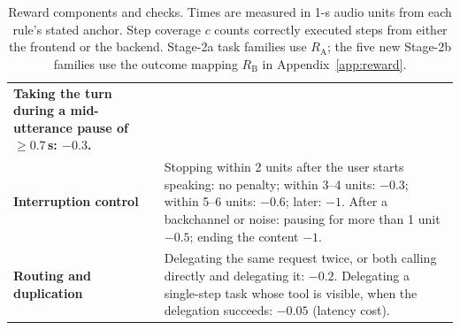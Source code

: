 \begin{table}[tp]
\begin{tabular}{@{}
  >{\raggedright\arraybackslash\bfseries}p{}
  @{\hspace{10pt}}
  >{\raggedright\arraybackslash}p{}
@{}}
Taking the turn during a mid-utterance pause of ${\ge}0.7$\,s: $-0.3$. \\
\duoprarewardsep
Interruption control &
Stopping within 2 units after the user starts speaking: no penalty; within 3--4 units: $-0.3$; within 5--6 units: $-0.6$; later: $-1$.
After a backchannel or noise: pausing for more than 1 unit $-0.5$; ending the content $-1$. \\
\duoprarewardsep
Routing and duplication &
Delegating the same request twice, or both calling directly and delegating it: $-0.2$.
Delegating a single-step task whose tool is visible, when the delegation succeeds: $-0.05$ (latency cost). \\
\bottomrule
\end{tabular}
\caption{Reward components and checks.
Times are measured in 1-s audio units from each rule's stated anchor. Step coverage $c$ counts correctly executed steps from either the frontend or the backend. Stage-2a task families use $R_{\mathrm A}$; the five new Stage-2b families use the outcome mapping $R_{\mathrm B}$ in Appendix~\ref{app:reward}.}
\label{tab:reward}
\end{table}
